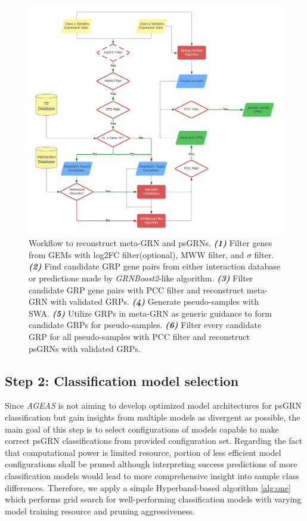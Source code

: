 \documentclass[fleqn,10pt]{wlscirep}
\begin{document}
    \begin{figure}[ht]
      \centering
      \includegraphics[width=0.8\linewidth, keepaspectratio,]{../images/data_preprocess_trans.png}
      \caption{
        Workflow to reconstruct meta-GRN and psGRNs.
        \textbf{\emph{(1)}} Filter genes from GEMs with log2FC filter(optional), MWW filter, and $\sigma$ filter.
        \textbf{\emph{(2)}} Find candidate GRP gene pairs from either interaction database or predictions made by \emph{GRNBoost2}\cite{grnboost2}-like algorithm.
        \textbf{\emph{(3)}} Filter candidate GRP gene pairs with PCC filter and reconstruct meta-GRN with validated GRPs.
        \textbf{\emph{(4)}} Generate pseudo-samples with SWA.
        \textbf{\emph{(5)}} Utilize GRPs in meta-GRN as generic guidance to form candidate GRPs for pseudo-samples.
        \textbf{\emph{(6)}} Filter every candidate GRP for all pseudo-samples with PCC filter and reconstruct psGRNs with validated GRPs.
      }
      \label{data_preprocess}
    \end{figure}

  \subsection*{Step 2: Classification model selection}
    \label{step2}
    Since \emph{AGEAS} is not aiming to develop optimized model architectures for psGRN classification but gain insights from multiple models as divergent as possible, the main goal of this step is to select configurations of models capable to make correct psGRN classifications from provided configuration set.
    Regarding the fact that computational power is limited resource, portion of less efficient model configurations shall be pruned although interpreting success predictions of more classification models would lead to more comprehensive insight into sample class differences.
    Therefore, we apply a simple Hyperband\cite{hyperband}-based algorithm \ref{alg:one} which performs grid search for well-performing classification models with varying model training resource and pruning aggressiveness.
\end{document}
